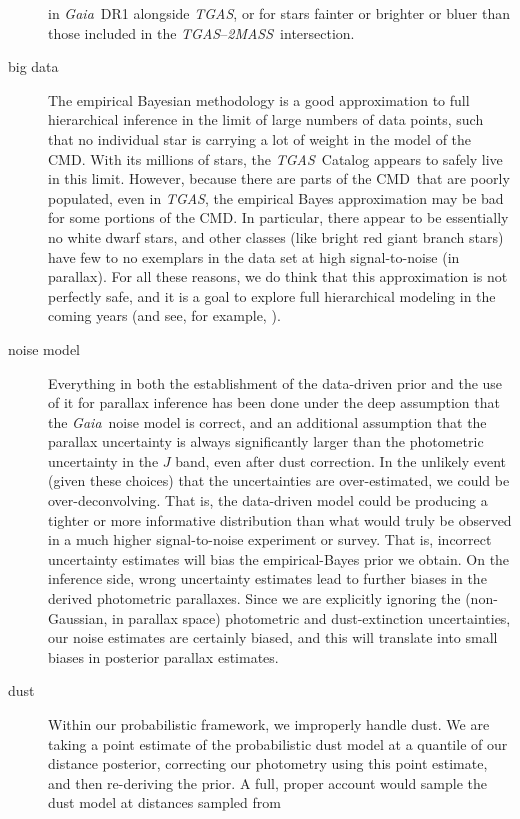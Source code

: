 \documentclass[modern]{aastex61}
\newcommand{\acronym}[1]{{\small{#1}}}
\newcommand{\project}[1]{\textsl{#1}}
\newcommand{\tgas}{\project{\acronym{TGAS}}}
\newcommand{\tmass}{\project{\acronym{2MASS}}}
\newcommand{\gaia}{\project{Gaia}}
\newcommand{\cmd}{\acronym{CMD}}
\begin{document}
\begin{description}
  in \gaia\ DR1 alongside \tgas, or for stars fainter or brighter or
  bluer than those included in the \tgas--\tmass\ intersection.
\item[big data] The empirical Bayesian methodology is a good
  approximation to full hierarchical inference in the limit of large
  numbers of data points, such that no individual star is carrying a
  lot of weight in the model of the \cmd.  With its millions of stars,
  the \tgas\ Catalog appears to safely live in this limit.  However,
  because there are parts of the \cmd\ that are poorly populated, even
  in \tgas, the empirical Bayes approximation may be bad for some
  portions of the \cmd.  In particular, there appear to be essentially
  no white dwarf stars, and other classes (like bright red giant
  branch stars) have few to no exemplars in the data set at high
  signal-to-noise (in parallax).  For all these reasons, we do think
  that this approximation is not perfectly safe, and it is a goal to
  explore full hierarchical modeling in the coming years (and see, for
  example, \citealt{leistedtHogg2017}).
\item[noise model] Everything in both the establishment of the data-driven
  prior and the use of it for parallax inference has been done under the deep
  assumption that the \gaia\ noise model is correct, and an additional
  assumption that the parallax uncertainty is always significantly larger
  than the photometric uncertainty in the $J$ band, even after dust correction.
  In the unlikely event (given these choices) that the
  uncertainties are over-estimated, we could be over-deconvolving.
  That is, the data-driven model could be producing a tighter or more
  informative distribution than what would truly be observed in a much
  higher signal-to-noise experiment or survey. That is, incorrect uncertainty
  estimates will bias the empirical-Bayes prior we obtain. On the inference
  side, wrong uncertainty estimates lead to further biases in the derived photometric parallaxes.
  Since we are explicitly ignoring the (non-Gaussian, in parallax space) photometric
  and dust-extinction uncertainties, our noise estimates are certainly biased, and
  this will translate into small biases in posterior parallax estimates.
\item[dust] Within our probabilistic framework, we improperly handle
  dust. We are taking a point estimate of the probabilistic dust model
  at a quantile of our distance posterior, correcting our photometry
  using this point estimate, and then re-deriving the prior. A full,
  proper account would sample the dust model at distances sampled from

\end{description}
\end{document}
